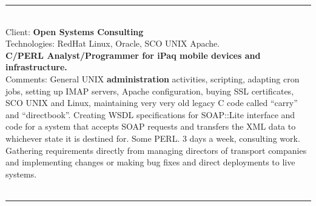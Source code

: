 \documentclass{article}
\begin{document}
\noindent\hfil\rule{0.5\textwidth}{.4pt}\hfil
\\



Client: 	\textbf  { Open Systems Consulting }  \\
Technologies: 	RedHat Linux, Oracle, SCO UNIX Apache. \\
\textbf{ 		C/PERL Analyst/Programmer for iPaq mobile devices and infrastructure. } \\
Comments:	General UNIX {\bf administration} activities, scripting, adapting cron jobs, setting up IMAP servers, Apache configuration, buying SSL certificates, SCO UNIX and Linux, maintaining very very old legacy C code called “carry” and “directbook”. Creating WSDL specifications for SOAP::Lite interface and code for a system that accepts SOAP requests and transfers the XML data to whichever state it is destined for. Some PERL.  3 days a week, consulting work. Gathering requirements directly from managing directors of transport companies and implementing changes or making bug fixes and direct deployments to live systems. \\
\\

\noindent\hfil\rule{0.5\textwidth}{.4pt}\hfil
\\


%
%
%

%


%


\end{document}
